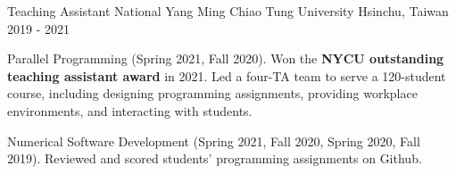 \begin{cventries}
  \cventry
    {Teaching Assistant} %
    {National Yang Ming Chiao Tung University} %
    {Hsinchu, Taiwan} %
    {2019 - 2021} %
    {
      \begin{cvitems} %
        \item {Parallel Programming (Spring 2021, Fall 2020). Won the \textbf{NYCU outstanding teaching assistant award} in 2021.
        Led a four-TA team to serve a 120-student course, including designing programming assignments,
        providing workplace environments, and interacting with students.
        }
        \item {Numerical Software Development (Spring 2021, Fall 2020, Spring 2020, Fall 2019).
        Reviewed and scored students' programming assignments on Github.
        }
      \end{cvitems}
    }

    \vspace{-2mm}





\end{cventries}

